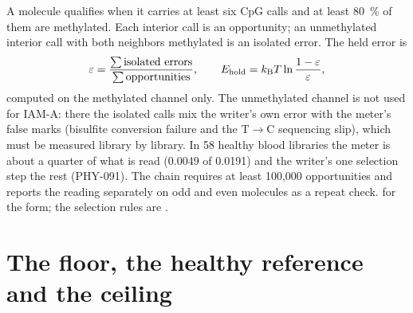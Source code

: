 A molecule qualifies when it carries at least six CpG calls and at least 80~\% of them are methylated. Each interior call is
an opportunity; an unmethylated interior call with both neighbors methylated is an isolated error. The held error is
\begin{equation}
  \varepsilon=\frac{\sum\text{isolated errors}}{\sum\text{opportunities}},
  \qquad E_{\rm hold}=k_{\mathrm B} T\ln\frac{1-\varepsilon}{\varepsilon},
  \label{eq:eps}
\end{equation}
computed on the methylated channel only. The unmethylated channel is not used for IAM-A: there the isolated calls mix the writer's own
error with the meter's false marks (bisulfite conversion failure and the T$\to$C sequencing slip), which must be measured library by library.
In 58 healthy blood libraries the meter is about a quarter of what is read (0.0049 of 0.0191) and the writer's one selection step the rest
(PHY-091). \measured{} The chain requires at least 100,000 opportunities and reports the reading separately on odd and even
molecules as a repeat check. \derived{} for the form; the selection rules are \calibrated.

\section{The floor, the healthy reference and the ceiling}

